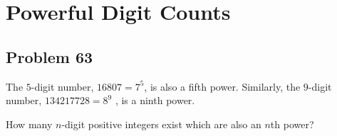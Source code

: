 \chapter{Powerful Digit Counts}
\section{Problem 63}
The $5$-digit number, $16807=7^5$, is also a fifth power. Similarly, the $9$-digit number, $134217728=8^9$ , is a ninth power.

How many $n$-digit positive integers exist which are also an $n$th power?
